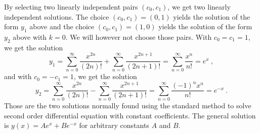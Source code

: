 \begin{egg}
By selecting two linearly independent pairs $(c_0,c_1)$, we get two
linearly independent solutions.  The choice $(c_0,c_1) = (0,1)$ yields
the solution of the form $y_1$ above and the choice $(c_0,c_1)= (1,0)$
yields the solution of the form $y_2$ above with $k=0$.  We will
however not choose those pairs.  With $c_0=c_1 =1$, we get the solution
\[
y_1 = \sum_{n=0}^\infty \frac{x^{2n}}{(2n)!}
+ \sum_{n=0}^\infty \frac{x^{2n+1}}{(2n+1)!} 
= \sum_{n=0}^\infty \frac{x^{n}}{n!}  = e^x \  ,
\]
and with $c_0 = -c_1 = 1$, we get the solution
\[
y_2 = \sum_{n=0}^\infty \frac{x^{2n}}{(2n)!}
- \sum_{n=0}^\infty \frac{x^{2n+1}}{(2n+1)!} 
= \sum_{n=0}^\infty \frac{(-1)^nx^{n}}{n!}  = e^{-x} \  .
\]
Those are the two solutions normally found using the standard method
to solve second order differential equation with constant
coefficients.  The general solution is
$\displaystyle y(x) = A e^x + B e^{-x}$ for arbitrary constants $A$
and $B$.
\end{egg}

